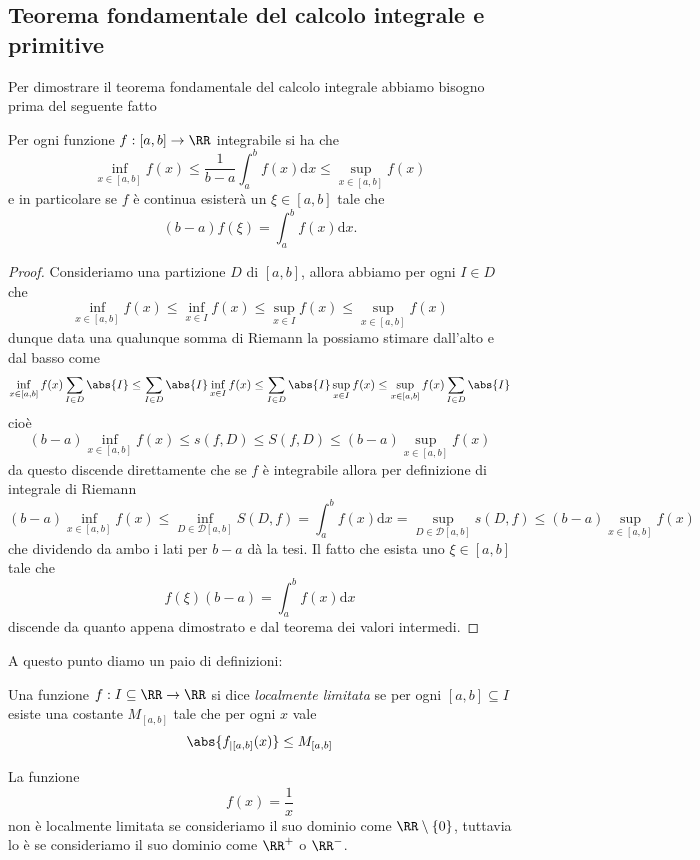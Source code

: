 \documentclass[11pt]{scrartcl}
\newcommand{\dif}{\text{d}}
\begin{document}
	\subsection{Teorema fondamentale del calcolo integrale e primitive}
	Per dimostrare il teorema fondamentale del calcolo integrale abbiamo bisogno prima del seguente fatto
	\begin{theorem}
		Per ogni funzione $f:[a,b]\to\RR$ integrabile si ha che
		$$\inf_{x\in [a,b]}f(x)\le \frac{1}{b-a}\int_a^b f(x)\dif x\le \sup_{x\in [a,b]}f(x)$$
		e in particolare se $f$ è continua esisterà un $\xi\in [a,b]$ tale che
		$$(b-a)f(\xi)=\int_a^b f(x)\dif x.$$
	\end{theorem}
	\begin{proof}
		Consideriamo una partizione $D$ di $[a,b]$, allora abbiamo per ogni $I\in D$ che 
		$$\inf_{x\in [a,b]}f(x)\le \inf_{x\in I}f(x)\le \sup_{x\in I}f(x)\le \sup_{x\in [a,b]}f(x)$$
		dunque data una qualunque somma di Riemann la possiamo stimare dall'alto e dal basso come
		$$\inf_{x\in [a,b]}f(x)\sum_{I\in D}\abs{I}\le \sum_{I\in D}\abs{I}\inf_{x\in I}f(x)\le \sum_{I\in D}\abs{I}\sup_{x\in I}f(x)\le \sup_{x\in [a,b]}f(x)\sum_{I\in D}\abs{I}$$
		cioè
		$$(b-a)\inf_{x\in [a,b]}f(x)\le s(f,D)\le S(f,D)\le (b-a)\sup_{x\in [a,b]}f(x)$$
		da questo discende direttamente che se $f$ è integrabile allora per definizione di integrale di Riemann
		$$(b-a)\inf_{x\in [a,b]}f(x)\le\inf_{D\in \mathcal{D}[a,b]}S(D,f)=\int_a^bf(x)\dif x=\sup_{D\in \mathcal{D}[a,b]}s(D,f)\le (b-a)\sup_{x\in [a,b]}f(x)$$
		che dividendo da ambo i lati per $b-a$ dà la tesi. Il fatto che esista uno $\xi\in [a,b]$ tale che
		$$f(\xi)(b-a)=\int_a^b f(x)\dif x$$
		discende da quanto appena dimostrato e dal teorema dei valori intermedi. 
	\end{proof}
	A questo punto diamo un paio di definizioni:
	\begin{definition}
		Una funzione $f:I\subseteq \RR\to\RR$ si dice \textit{localmente limitata} se per ogni $[a,b]\subseteq I$ esiste una costante $M_{[a,b]}$ tale che per ogni $x$ vale
		$$\abs{f_{\mid [a,b]}(x)}\le M_{[a,b]}$$
	\end{definition}
	\begin{example}
		La funzione
		$$f(x)=\frac{1}{x}$$
		non è localmente limitata se consideriamo il suo dominio come $\RR\setminus\left\{0\right\}$, tuttavia lo è se consideriamo il suo dominio come $\RR^+$ o $\RR^-$.
	\end{example}
\end{document}
